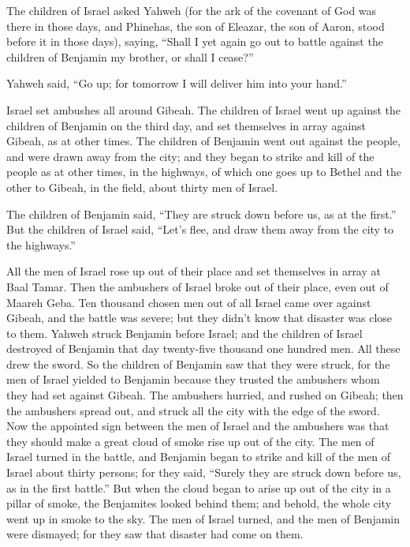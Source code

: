 {The children of Israel asked Yahweh (for the ark of the covenant of God was there in those days,
and Phinehas, the son of Eleazar, the son of Aaron, stood before it in those days), saying, “Shall I yet again go out to battle against the children of Benjamin my brother, or shall I cease?”
\par }{\PP Yahweh said, “Go up; for tomorrow I will deliver him into your hand.”
\par }{\PP {}Israel set ambushes all around Gibeah.
The children of Israel went up against the children of Benjamin on the third day, and set themselves in array against Gibeah, as at other times.
The children of Benjamin went out against the people, and were drawn away from the city; and they began to strike and kill of the people as at other times, in the highways, of which one goes up to Bethel and the other to Gibeah, in the field, about thirty men of Israel.
\par }{\PP {}The children of Benjamin said, “They are struck down before us, as at the first.” But the children of Israel said, “Let’s flee, and draw them away from the city to the highways.”
\par }{\PP {}All the men of Israel rose up out of their place and set themselves in array at Baal Tamar. Then the ambushers of Israel broke out of their place, even out of Maareh Geba.
Ten thousand chosen men out of all Israel came over against Gibeah, and the battle was severe; but they didn’t know that disaster was close to them.
Yahweh struck Benjamin before Israel; and the children of Israel destroyed of Benjamin that day twenty-five thousand one hundred men. All these drew the sword.
So the children of Benjamin saw that they were struck, for the men of Israel yielded to Benjamin because they trusted the ambushers whom they had set against Gibeah.
The ambushers hurried, and rushed on Gibeah; then the ambushers spread out, and struck all the city with the edge of the sword.
Now the appointed sign between the men of Israel and the ambushers was that they should make a great cloud of smoke rise up out of the city.
The men of Israel turned in the battle, and Benjamin began to strike and kill of the men of Israel about thirty persons; for they said, “Surely they are struck down before us, as in the first battle.”
But when the cloud began to arise up out of the city in a pillar of smoke, the Benjamites looked behind them; and behold, the whole city went up in smoke to the sky.
The men of Israel turned, and the men of Benjamin were dismayed; for they saw that disaster had come on them.
}
